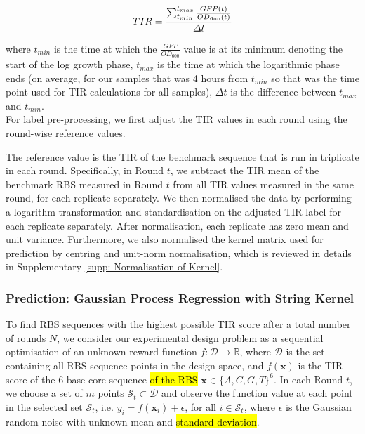 $$\mathnormal{TIR=\frac{\sum_{t_{min}}^{t_{max}}\frac{GFP(t)}{OD_{600}(t)}}{\Delta t}}$$

where ${t_{min}}$ is the time at which the $\frac{GFP}{OD_{600}}$ value is at its minimum denoting the start of the log growth phase, ${t_{max}}$ is the time at which the logarithmic phase ends (on average, for our samples that was 4 hours from ${t_{min}}$ so that was the time point used for TIR calculations for all samples), ${\Delta t}$ is the difference between ${t_{max}}$ and ${t_{min}}$.\\

For label pre-processing, we first adjust the TIR values in each round using the round-wise reference values.

The reference value is the TIR of the benchmark sequence that is run in triplicate in each round.
Specifically, in Round $t$, we subtract the TIR mean of the benchmark RBS measured in Round $t$ from all TIR values measured in the same round, for each replicate separately. 
We then normalised the data by performing a logarithm transformation and standardisation on the adjusted TIR label for each replicate separately.
After normalisation, each replicate has zero mean and unit variance.
Furthermore, we also normalised the kernel matrix used for prediction by centring and unit-norm normalisation, which is reviewed in details in Supplementary \ref{supp: Normalisation of Kernel}.


\subsubsection{Prediction: Gaussian Process Regression with String Kernel}
\label{sec: method prediction with kernel}


To find RBS sequences with the highest possible TIR score after a total number of rounds $N$, we consider our experimental design problem as a sequential optimisation of an unknown reward function $f: \mathcal{D} \rightarrow \mathbb{R}$, where $\mathcal{D}$ is the set containing all RBS sequence points in the design space, and $f(\mathbf{x})$ is the TIR score of the 6-base core sequence \hl{ of the RBS} $\mathbf{x} \in \{A,C,G,T\}^{6}$.
In each Round $t$, we choose a set of $m$ points $\mathcal{S}_t \subset \mathcal{D}$ and observe the function value at each point in the selected set $\mathcal{S}_t$, i.e. $y_i = f(\mathbf{x}_i) + \epsilon$, for all $i \in \mathcal{S}_t$, where $\epsilon$ is the Gaussian random noise with unknown mean and \hl{standard deviation}. \\

